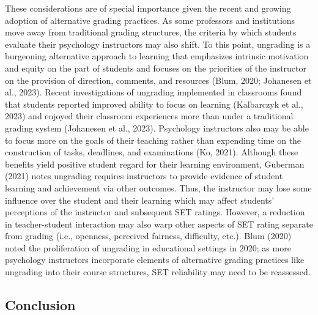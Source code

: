 \documentclass[
  man]{apa7}
\begin{document}
These considerations are of special importance given the recent and
growing adoption of alternative grading practices. As some professors
and institutions move away from traditional grading structures, the
criteria by which students evaluate their psychology instructors may
also shift. To this point, ungrading is a burgeoning alternative
approach to learning that emphasizes intrinsic motivation and equity on
the part of students and focuses on the priorities of the instructor on
the provision of direction, comments, and resources (Blum, 2020; Johanesen et al., 2023). Recent investigations of ungrading implemented in
classrooms found that students reported improved ability to focus on
learning (Kalbarczyk et al., 2023) and enjoyed their classroom experiences more
than under a traditional grading system (Johanesen et al., 2023). Psychology
instructors also may be able to focus more on the goals of their
teaching rather than expending time on the construction of tasks,
deadlines, and examinations (Ko, 2021). Although these benefits yield
positive student regard for their learning environment, Guberman (2021)
notes ungrading requires instructors to provide evidence of student
learning and achievement via other outcomes. Thus, the instructor may
lose some influence over the student and their learning which may affect
students' perceptions of the instructor and subsequent SET ratings.
However, a reduction in teacher-student interaction may also warp other
aspects of SET rating separate from grading (i.e., openness, perceived
fairness, difficulty, etc.). Blum (2020) noted the proliferation of
ungrading in educational settings in 2020; as more psychology
instructors incorporate elements of alternative grading practices like
ungrading into their course structures, SET reliability may need to be
reassessed.

\hypertarget{conclusion}{%
\subsection{Conclusion}\label{conclusion}}
\end{document}
